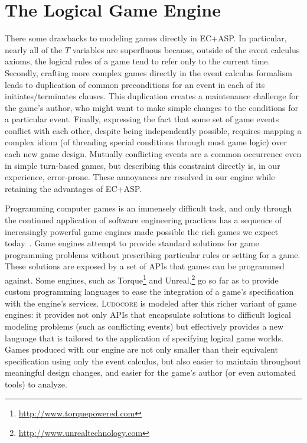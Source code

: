 \documentclass[conference]{IEEEtran}
\newcommand{\Ludocore}{\textsc{Ludocore}}
\begin{document}
\section{The Logical Game Engine}

There some drawbacks to modeling games directly in EC+ASP. In particular,
nearly all of the $T$ variables are superfluous because, outside of the event
calculus axioms, the logical rules of a game tend to refer only to the current
time. Secondly, crafting more complex games directly in the event
calculus formalism leads to duplication of common preconditions for an event in
each of its initiates/terminates clauses. This duplication creates a
maintenance challenge for the game's author, who might want to make simple
changes to the conditions for a particular event. Finally, expressing the fact
that some set of game events conflict with each other, despite being
independently possible, requires mapping a complex idiom (of threading special
conditions through most game logic) over each new game design. Mutually
conflicting events are a common occurrence even in simple turn-based games,
but describing this constraint directly is, in our experience, error-prone.
These annoyances are resolved in our engine while retaining the advantages
of EC+ASP.

Programming computer games is an immensely difficult task, and only through the
continued application of software engineering practices has a sequence of
increasingly powerful game engines made possible the rich games we expect
today~\citep{Blow:Harder}. Game engines attempt to provide standard solutions
for game programming problems without prescribing particular rules or setting
for a game. These solutions are exposed by a set of APIs that games can be
programmed against. Some engines, such as
Torque\footnote{\url{http://www.torquepowered.com}} and
Unreal,\footnote{\url{http://www.unrealtechnology.com}} go so far as to provide
custom programming languages to ease the integration of a game's specification
with the engine's services. \Ludocore{} is modeled after this richer variant of
game engines: it provides not only APIs that encapsulate solutions to difficult
logical modeling problems (such as conflicting events) but effectively provides
a new language that is tailored to the application of specifying logical game
worlds. Games produced with our engine are not only smaller than their
equivalent specification using only the event calculus, but also easier to maintain
throughout meaningful design changes, and easier for the game's author (or even
automated tools) to analyze.
\end{document}
